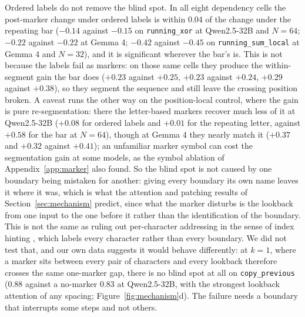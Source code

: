 \documentclass[10pt]{article} %
\newcommand{\task}[1]{\texttt{#1}}
\begin{document}
Ordered labels do not remove the blind spot. In all eight dependency cells the post-marker change under ordered labels is within 0.04 of the change under the repeating bar ($-0.14$ against $-0.15$ on \task{running\_xor} at Qwen2.5-32B and $N = 64$; $-0.22$ against $-0.22$ at Gemma 4; $-0.42$ against $-0.45$ on \task{running\_sum\_local} at Gemma 4 and $N = 32$), and it is significant wherever the bar's is. This is not because the labels fail as markers: on those same cells they produce the within-segment gain the bar does ($+0.23$ against $+0.25$, $+0.23$ against $+0.24$, $+0.29$ against $+0.38$), so they segment the sequence and still leave the crossing position broken. A caveat runs the other way on the position-local control, where the gain is pure re-segmentation: there the letter-based markers recover much less of it at Qwen2.5-32B ($+0.08$ for ordered labels and $+0.01$ for the repeating letter, against $+0.58$ for the bar at $N = 64$), though at Gemma 4 they nearly match it ($+0.37$ and $+0.32$ against $+0.41$); an unfamiliar marker symbol can cost the segmentation gain at some models, as the symbol ablation of Appendix~\ref{app:marker} also found. So the blind spot is not caused by one boundary being mistaken for another: giving every boundary its own name leaves it where it was, which is what the attention and patching results of Section~\ref{sec:mechanism} predict, since what the marker disturbs is the lookback from one input to the one before it rather than the identification of the boundary. This is not the same as ruling out per-character addressing in the sense of index hinting \citep{zhou2024algorithms}, which labels every character rather than every boundary. We did not test that, and our own data suggests it would behave differently: at $k = 1$, where a marker sits between every pair of characters and every lookback therefore crosses the same one-marker gap, there is no blind spot at all on \task{copy\_previous} (0.88 against a no-marker 0.83 at Qwen2.5-32B, with the strongest lookback attention of any spacing; Figure~\ref{fig:mechanism}d). The failure needs a boundary that interrupts some steps and not others.
\end{document}

